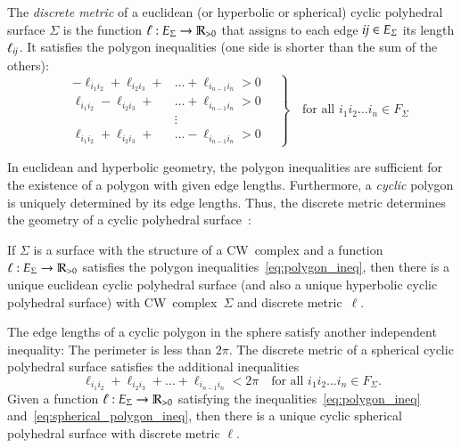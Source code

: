 \documentclass[Thesis]{subfiles}
\begin{document}
The \emph{discrete metric} of a euclidean (or hyperbolic or spherical) cyclic polyhedral surface $\Sigma$ is the function $\ell:E_{\Sigma}\rightarrow\mathbb R_{>0}$ that assigns to each edge $\it ij \in E_{\Sigma}$ its
length $\ell_{\it ij}$. 
It satisfies the polygon inequalities (one side is shorter than the sum of the others):
\begin{equation}
\label{eq:polygon_ineq}
\left.
\quad
\begin{aligned}
-\ell_{i_{1}i_{2}}+\ell_{i_{2}i_{3}}+&\ldots+\ell_{i_{n-1}i_{n}}
>0\\
\ell_{i_{1}i_{2}}-\ell_{i_{2}i_{3}}+&\ldots+\ell_{i_{n-1}i_{n}}
>0\\
&\vdots\\
\ell_{i_{1}i_{2}}+\ell_{i_{2}i_{3}}+&\ldots-\ell_{i_{n-1}i_{n}}
>0
\end{aligned}
\quad
\right\}
\quad
\text{for all $i_{1}i_{2}\ldots i_{n}\in F_{\Sigma}$}
\end{equation}

In euclidean and hyperbolic geometry, the polygon inequalities are sufficient for the existence of a polygon with given edge lengths. 
Furthermore, a \emph{cyclic} polygon is uniquely determined by its edge lengths. 
Thus, the discrete metric determines the geometry of a cyclic polyhedral surface~\cite{KSS15}:

If $\Sigma$ is a surface with the structure of a CW~complex and a function $\ell:E_{\Sigma}\rightarrow\mathbb R_{>0}$ satisfies the polygon inequalities~\eqref{eq:polygon_ineq}, then there is a unique euclidean
cyclic polyhedral surface (and also a unique hyperbolic cyclic polyhedral surface) with CW~complex~$\Sigma$ and discrete metric~$\ell$.

The edge lengths of a cyclic polygon in the sphere satisfy another independent inequality: The perimeter is less than $2\pi$.  
The discrete metric of a spherical cyclic polyhedral surface satisfies the additional inequalities
\begin{equation}
\label{eq:spherical_polygon_ineq}
\ell_{i_{1}i_{2}}+\ell_{i_{2}i_{3}}+\ldots+\ell_{i_{n-1}i_{n}}<2\pi
\quad
\text{for all $i_{1}i_{2}\ldots i_{n}\in F_{\Sigma}$.}
\end{equation}
Given a function $\ell:E_{\Sigma}\rightarrow\mathbb R_{>0}$ satisfying the inequalities~\eqref{eq:polygon_ineq}
and~\eqref{eq:spherical_polygon_ineq}, then there is a unique cyclic spherical polyhedral surface with discrete metric $\ell$.
\end{document}
